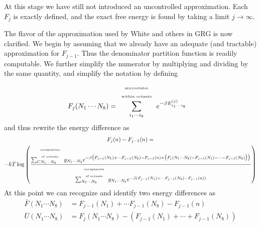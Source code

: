 \documentclass[letterpaper,twocolumn,amsmath,amssymb,pre,aps,10pt]{revtex4-1}
\newcommand{\fixme}[1]{{\bf\color{red}{[#1]}}}
\begin{document}
At this stage we have still not introduced an uncontrolled
approximation.  Each $F_{j}$ is exactly defined, and the exact free
energy is found by taking a limit $j\rightarrow \infty$.  \fixme{I
  need to clarify the scale of each $F$.  Some of the above are about
  systems $\frac18$ the volume of others.}

The flavor of the approximation used by White and others in GRG is now
clarified.  We begin by assuming that we already have an adequate (and
tractable) approximation for $F_{j-1}$.  Thus the denominator
partition function is readily computable.  We further simplify the
numerator by multiplying and dividing by the same quantity, and
simplify the notation by defining
\begin{align}
  F_j(N_1\cdots N_8) &= \sum_{i_1\cdots i_8}^{\scriptscriptstyle\begin{array}{c}
                  \text{\tiny microstates}\\
                  \text{\tiny within octants}\\
                 \end{array}}
       e^{-\beta E_{i_1\cdots i_8}^{(j)}}
\end{align}
and thus rewrite the energy difference as
\begin{multline}
  F_j(n) - F_{j-1}(n) =\\
  -kT\log\left(\frac{
    \sum_{CN_1\cdots N_8}^{\scriptscriptstyle\begin{array}{c}
                  \text{\tiny occupancies}\\
                  \text{\tiny of octants}\\
                 \end{array}}
       g_{N_1\cdots N_8}
       e^{-\beta \big(F_{j-1}(N_1) + \cdots F_{j-1}(N_8)  - F_{j-1}(n) +
           \big(F_j(N_1\cdots N_8) - F_{j-1}(N_1) - \cdots - F_{j-1}(N_8)\big) \big)}
  }{
    \sum_{N_1\cdots N_8}^{\scriptscriptstyle\begin{array}{c}
                  \text{\tiny occupancies}\\
                  \text{\tiny of octants}\\
                 \end{array}}
       g_{N_1\cdots N_8}
       e^{-\beta \left( F_{j-1}(N_1) + \cdots F_{j-1}(N_8)  - F_{j-1}(n) \right)}
  }
  \right)
\end{multline}
At this point we can recognize and identify two energy differences as
\begin{align}
  \bar{F}(N_1\cdots N_8) &= F_{j-1}(N_1) + \cdots F_{j-1}(N_8)  - F_{j-1}(n) \\
  \bar{U}(N_1\cdots N_8) &= F_j(N_1\cdots N_8)
  - \left(F_{j-1}(N_1) + \cdots + F_{j-1}(N_8) \right)
\end{align}
\end{document}
